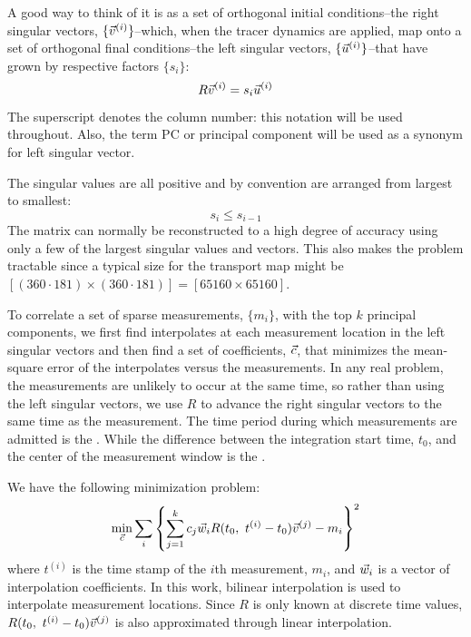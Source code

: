 A good way to think of it is as a set of orthogonal initial conditions--the right singular vectors, $\lbrace \vec v^{(i)} \rbrace$--which, when the tracer dynamics are applied, 
map onto a set of orthogonal final conditions--the left singular vectors, $\lbrace \vec u^{(i)} \rbrace$--that have grown by respective factors $\lbrace s_i \rbrace$:
\begin{equation}
	R \vec v^{(i)} = s_i \vec u^{(i)}
\end{equation}
The superscript denotes the column number: 
this notation will be used throughout.
Also, the term PC or principal component will be used as a synonym for left singular vector.

The singular values are all positive and by convention are arranged from largest to smallest:
\begin{equation}
	s_i \le s_{i-1}
\end{equation}
The matrix can normally be reconstructed to a high degree of accuracy
using only a few of the largest singular values and vectors.
This also makes the problem tractable since a typical size for
the transport map might be $[(360\cdot181) \times (360\cdot181)] = [65160\times65160]$.

To correlate a set of sparse measurements, $\lbrace m_i \rbrace$,
with the top $k$ principal components, we first find interpolates at each
measurement location in the left singular vectors and then find a set
of coefficients, $\vec c$, that minimizes the mean-square error of the
interpolates versus the measurements.
In any real problem, the measurements are unlikely to occur at the same time,
so rather than using the left singular vectors, we use $R$ to advance the
right singular vectors to the same time as the measurement.
The time period during which measurements are admitted is the .
While the difference between the integration start time, $t_0$,
and the center of the measurement window is the .

We have the following minimization problem:
\begin{equation}
\min_{\vec c} \sum_i \left \lbrace \sum_{j=1}^k c_j \vec w_i R(t_0, ~ t^{(i)}-t_0) \vec v^{(j)} - m_i \right \rbrace^2
	\label{PC_proxy_def}
\end{equation}
where $t^{(i)}$ is the time stamp of the $i$th measurement, $m_i$, 
and $\vec w_i$ is a vector of interpolation coefficients.
In this work, bilinear interpolation is used to interpolate measurement
locations. 
Since $R$ is only known at discrete time values, 
$R(t_0, ~t^{(i)}-t_0) \vec v^{(j)}$ 
is also approximated through linear interpolation.

